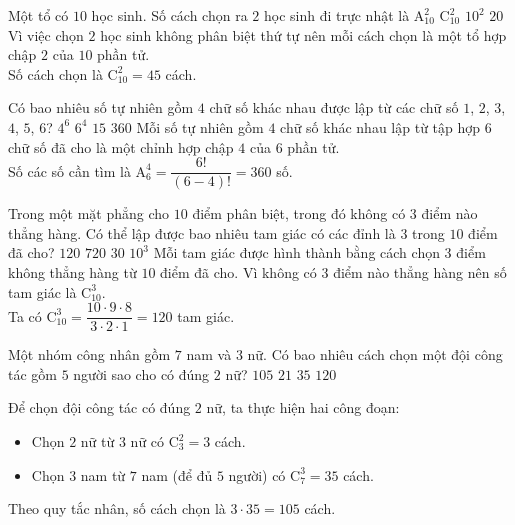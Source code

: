 \begin{ex}%
	Một tổ có $10$ học sinh. Số cách chọn ra $2$ học sinh đi trực nhật là
	\choice
	{$\mathrm{A}_{10}^2$}
	{\True $\mathrm{C}_{10}^2$}
	{$10^2$}
	{$20$}
	\loigiai
	{
		Vì việc chọn $2$ học sinh không phân biệt thứ tự nên mỗi cách chọn là một tổ hợp chập $2$ của $10$ phần tử.\\
		Số cách chọn là $\mathrm{C}_{10}^2 = 45$ cách.
	}
\end{ex}
\begin{ex}%
	Có bao nhiêu số tự nhiên gồm $4$ chữ số khác nhau được lập từ các chữ số $1$, $2$, $3$, $4$, $5$, $6$?
	\choice
	{$4^6$}
	{$6^4$}
	{$15$}
	{\True $360$}
	\loigiai
	{
		Mỗi số tự nhiên gồm $4$ chữ số khác nhau lập từ tập hợp $6$ chữ số đã cho là một chỉnh hợp chập $4$ của $6$ phần tử.\\
		Số các số cần tìm là $\mathrm{A}_6^4 = \dfrac{6!}{(6-4)!} = 360$ số.
	}
\end{ex}
\begin{ex}%
	Trong một mặt phẳng cho $10$ điểm phân biệt, trong đó không có $3$ điểm nào thẳng hàng. Có thể lập được bao nhiêu tam giác có các đỉnh là $3$ trong $10$ điểm đã cho?
	\choice
	{\True $120$}
	{$720$}
	{$30$}
	{$10^3$}
	\loigiai
	{
		Mỗi tam giác được hình thành bằng cách chọn $3$ điểm không thẳng hàng từ $10$ điểm đã cho. Vì không có $3$ điểm nào thẳng hàng nên số tam giác là $\mathrm{C}_{10}^3$.\\
		Ta có $\mathrm{C}_{10}^3 = \dfrac{10 \cdot 9 \cdot 8}{3 \cdot 2 \cdot 1} = 120$ tam giác.
	}
\end{ex}
\begin{ex}%
	Một nhóm công nhân gồm $7$ nam và $3$ nữ. Có bao nhiêu cách chọn một đội công tác gồm $5$ người sao cho có đúng $2$ nữ?
	\choice
	{\True $105$}
	{$21$}
	{$35$}
	{$120$}
	\loigiai
	{
		Để chọn đội công tác có đúng $2$ nữ, ta thực hiện hai công đoạn:
		\begin{itemize}
			\item Chọn $2$ nữ từ $3$ nữ có $\mathrm{C}_3^2 = 3$ cách.
			\item Chọn $3$ nam từ $7$ nam (để đủ $5$ người) có $\mathrm{C}_7^3 = 35$ cách.
		\end{itemize}
		Theo quy tắc nhân, số cách chọn là $3 \cdot  35 = 105$ cách.
	}
\end{ex}
